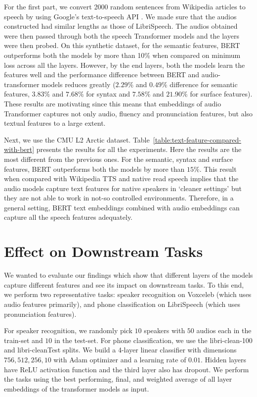 \documentclass[sigconf]{acmart}
\begin{document}
For the first part, we convert 2000 random sentences from Wikipedia articles to speech by using Google's text-to-speech API \cite{gtts}. We made sure that the audios constructed had similar lengths as those of LibriSpeech. The audios obtained were then passed through both the speech Transformer models and the layers were then probed. On this synthetic dataset, for the semantic features, BERT outperforms both the models by more than 10\% when compared on minimum loss across all the layers. However, by the end layers, both the models learn the features well and the performance difference between BERT and audio-transformer models reduces greatly ($2.29\%$ and $0.49\%$ difference for semantic features, $3.83\%$ and $7.68\%$ for syntax and $7.58\%$ and $21.90\%$ for surface features). These results are motivating since this means that embeddings of audio Transformer captures not only audio, fluency and pronunciation features, but also textual features to a large extent.


Next, we use the CMU L2 Arctic dataset. Table~\ref{table:text-feature-compared-with-bert} presents the results for all the experiments. Here the results are the most different from the previous ones. For the semantic, syntax and surface features, BERT outperforms both the models by more than $15\%$. This result when compared with Wikipedia TTS and native read speech implies that the audio models capture text features for native speakers in `cleaner settings' but they are not able to work in not-so controlled environments. Therefore, in a general setting, BERT text embeddings combined with audio embeddings can capture all the speech features adequately.

\section{Effect on Downstream Tasks}
\label{sec:Effect on Downstream Tasks}
We wanted to evaluate our findings which show that different layers of the models capture different features and see its impact on downstream tasks. To this end, we perform two representative tasks: speaker recognition on Voxceleb \cite{nagrani2017voxceleb} (which uses audio features primarily), and phone classification on LibriSpeech (which uses pronunciation features). 

For speaker recognition, we randomly pick $10$ speakers with $50$ audios each in the train-set and $10$ in the test-set. For phone classification, we use the libri-clean-100 and libri-cleanTest splits. We build a 4-layer linear classifier with dimensions $756, 512, 256, 10$ with Adam optimizer and a learning rate of $0.01$. Hidden layers have ReLU activation function and the third layer also has dropout. We perform the tasks using the best performing, final, and weighted average of all layer embeddings of the transformer models as input. 
\end{document}
